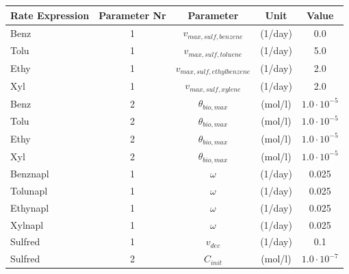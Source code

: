 \begin{table}[hb]

\centering
\footnotesize
\begin{tabular*}{\textwidth}{@{\extracolsep{\fill}}lcccc}
\toprule
Rate Expression & Parameter Nr & Parameter & Unit & Value \\
\midrule
Benz        & 1 & $v_{max,sulf,benzene}$     & (1/day)     & 0.0   \\
Tolu        & 1 & $v_{max,sulf,toluene}$     & (1/day)     & 5.0   \\
Ethy        & 1 & $v_{max,sulf,ethylbenzene}$& (1/day)     & 2.0   \\
Xyl         & 1 & $v_{max,sulf,xylene}   $   & (1/day)     & 2.0   \\
Benz        & 2 & $\theta_{bio,max}$ & (mol/l)              &  $1.0 \cdot 10^{-5}$  \\
Tolu        & 2 & $\theta_{bio,max}$ & (mol/l)              &  $1.0 \cdot 10^{-5}$  \\
Ethy        & 2 & $\theta_{bio,max}$ & (mol/l)              &  $1.0 \cdot 10^{-5}$  \\
Xyl         & 2 & $\theta_{bio,max}$ & (mol/l)              &  $1.0 \cdot 10^{-5}$  \\
Benznapl    & 1 & $\omega$  & (1/day)       & 0.025   \\
Tolunapl    & 1 & $\omega$  & (1/day)       & 0.025   \\
Ethynapl    & 1 & $\omega$  & (1/day)       & 0.025   \\
Xylnapl     & 1 & $\omega$  & (1/day)       & 0.025   \\
Sulfred & 1 & $v_{dec} $    & (1/day)                      &   0.1   \\
Sulfred & 2 & $C_{init}$    & (mol/l)                      &  $1.0 \cdot 10^{-7}$  \\
\bottomrule
\end{tabular*}
\label{tab:eh_rate_const}
\end{table}